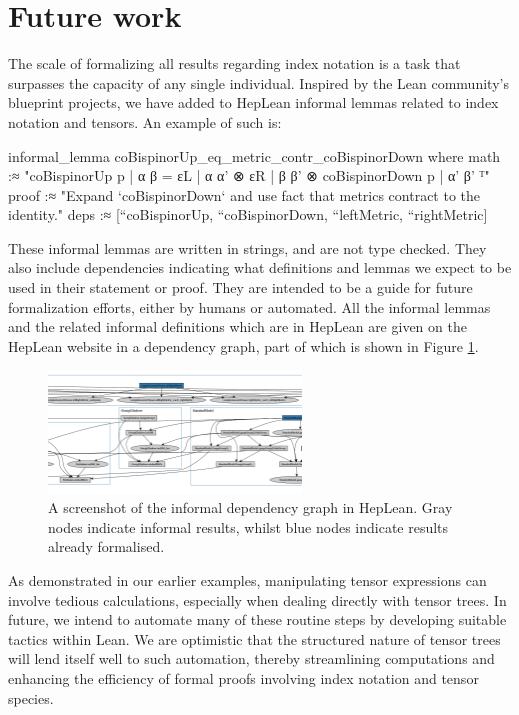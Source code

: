 \documentclass[a4paper, 11pt]{article}
\begin{document}
\section{Future work} \label{sec:future}
The scale of formalizing all results regarding index notation is a task that surpasses 
the capacity of any single individual. Inspired by the Lean community's 
blueprint projects, we have added to HepLean informal lemmas related to index notation and tensors. 
An example of such is: 
\begin{code} 
informal_lemma coBispinorUp_eq_metric_contr_coBispinorDown where
  math :≈ "{coBispinorUp p | α β = εL | α α' ⊗ εR | β β' ⊗ coBispinorDown p | α' β' }ᵀ"
  proof :≈ "Expand `coBispinorDown` and use fact that metrics contract to the identity."
  deps :≈ [``coBispinorUp, ``coBispinorDown, ``leftMetric, ``rightMetric]
\end{code}
These informal lemmas are written in strings, and are not type checked.
They also include dependencies indicating what definitions and lemmas we expect to be used in their statement or proof.
They are intended to be a guide for future formalization efforts, either by humans or 
automated. All the informal lemmas and the related informal definitions which are in HepLean are 
given on the HepLean website in a dependency graph, part of which is shown in Figure \ref{fig:informalLemmas}.
\begin{figure}
  \centering
  \includegraphics[width=0.6\textwidth]{informalLemmas.png}
  \caption{A screenshot of the informal dependency graph in HepLean. Gray nodes indicate informal results, whilst 
  blue nodes indicate results already formalised.}
  \label{fig:informalLemmas}
\end{figure}

As demonstrated in our earlier examples, manipulating tensor expressions can involve tedious
 calculations, especially when dealing directly with tensor trees. 
In future, we intend to automate many of these routine steps by developing suitable tactics 
within Lean. We are optimistic that the structured nature of tensor trees will lend itself well to 
such automation, thereby streamlining computations and enhancing the efficiency of formal proofs
involving index notation and tensor species.
\end{document}
